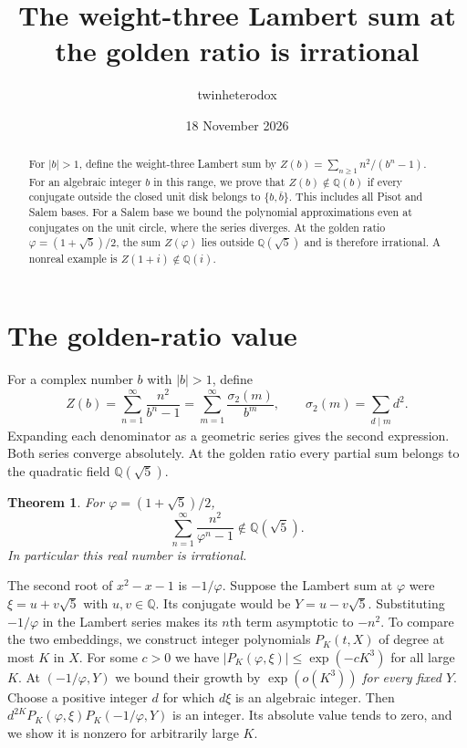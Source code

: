 \documentclass[11pt,letterpaper]{article}
\title{\fontsize{16}{20}\selectfont
  The weight-three Lambert sum at the golden ratio is irrational}
\author{twinheterodox}
\date{18 November 2026}
\newtheorem{theorem}{Theorem}[section]
\numberwithin{equation}{section}
\newcommand{\Q}{\mathbb Q}
\begin{document}
\maketitle

\begin{abstract}
For \(|b|>1\), define the weight-three Lambert sum by
\(Z(b)=\sum_{n\ge1}n^2/(b^n-1)\). For an algebraic integer \(b\)
in this range, we prove that \(Z(b)\notin\Q(b)\) if every conjugate
outside the closed unit disk belongs to \(\{b,\bar b\}\). This includes
all Pisot and Salem bases. For a Salem base we bound the polynomial
approximations even at conjugates on the unit circle, where the series
diverges. At the golden ratio \(\varphi=(1+\sqrt5)/2\), the sum
\(Z(\varphi)\) lies outside \(\Q(\sqrt5)\) and is therefore irrational.
A nonreal example is \(Z(1+i)\notin\Q(i)\).
\end{abstract}

\section{The golden-ratio value}\label{sec:intro}

For a complex number \(b\) with \(|b|>1\), define
\begin{equation}\label{eq:lambert}
 Z(b)=\sum_{n=1}^{\infty}\frac{n^2}{b^n-1}
     =\sum_{m=1}^{\infty}\frac{\sigma_2(m)}{b^m},
 \qquad \sigma_2(m)=\sum_{d\mid m}d^2 .
\end{equation}
Expanding each denominator as a geometric series gives the second
expression. Both series converge absolutely. At the golden ratio
every partial sum belongs to the quadratic field \(\Q(\sqrt5)\).

\begin{theorem}\label{thm:gold}
For \(\varphi=(1+\sqrt5)/2\),
\[
                     \sum_{n=1}^{\infty}\frac{n^2}{\varphi^n-1}
                         \notin \Q(\sqrt5).
\]
In particular this real number is irrational.
\end{theorem}

The second root of \(x^2-x-1\) is \(-1/\varphi\). Suppose the Lambert
sum at \(\varphi\) were \(\xi=u+v\sqrt5\) with \(u,v\in\Q\).
Its conjugate would be \(Y=u-v\sqrt5\). Substituting \(-1/\varphi\)
in the Lambert series makes its \(n\)th term asymptotic to \(-n^2\).
To compare the two embeddings, we construct integer polynomials
\(P_K(t,X)\) of degree at most \(K\) in \(X\). For some \(c>0\) we
have \(|P_K(\varphi,\xi)|\le\exp(-cK^3)\) for all large \(K\). At
\((-1/\varphi,Y)\) we bound their growth by \(\exp(o(K^3))\)
\emph{for every fixed \(Y\)}. Choose a positive integer \(d\) for
which \(d\xi\) is an algebraic integer. Then
\(d^{2K}P_K(\varphi,\xi)P_K(-1/\varphi,Y)\) is an integer. Its absolute value
tends to zero, and we show it is nonzero for arbitrarily large \(K\).
\end{document}
